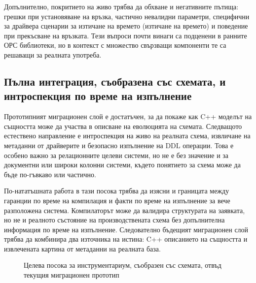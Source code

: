 Допълнително, покритието на живо трябва да обхване и негативните пътища: грешки при установяване на връзка, частично невалидни параметри, специфични за драйвера сценарии за изтичане на времето (изтичане на времето) и поведение при прекъсване на връзката. Тези въпроси почти винаги са подценени в ранните ОРС библиотеки, но в контекст с множество свързващи компоненти те са решаващи за реалната употреба.

\subsection{Пълна интеграция, съобразена със схемата, и интроспекция по време на изпълнение}

Прототипният миграционен слой е достатъчен, за да покаже как C++ моделът на същността може да участва в описване на еволюцията на схемата. Следващото естествено направление е интроспекция на живо на реалната схема, извличане на метаданни от драйверите и безопасно изпълнение на DDL операции. Това е особено важно за релационните целеви системи, но не е без значение и за документни или широки колонни системи, където понятието за схема може да бъде по-гъвкаво или частично.

По-нататъшната работа в тази посока трябва да изясни и границата между гаранции по време на компилация и факти по време на изпълнение за вече разположена система. Компилаторът може да валидира структурата на заявката, но не и реалното състояние на производствената схема без допълнителна информация по време на изпълнение. Следователно бъдещият миграционен слой трябва да комбинира два източника на истина: C++ описанието на същността и извлечената картина от метаданни на реалната база.

\begin{figure}[H]
\centering
{}
\caption{Целева посока за инструментариум, съобразен със схемата, отвъд текущия миграционен прототип}
\label{fig:future_schema_tooling}
\end{figure}

